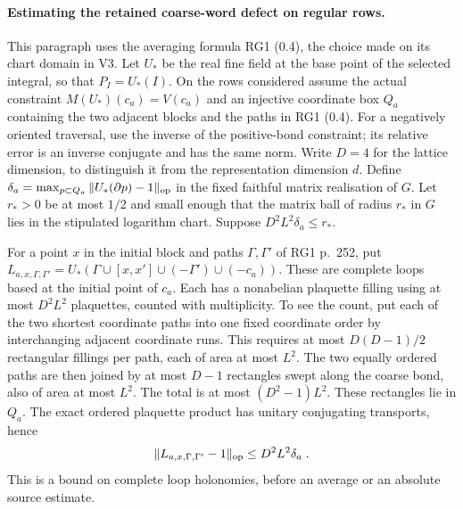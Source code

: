 \documentclass[11pt]{article}
\begin{document}
\paragraph{Estimating the retained coarse-word defect on regular rows.}
This paragraph uses the averaging formula RG1 (0.4), the choice
made on its chart domain in V3. Let $U_*$ be the real fine field
at the base point of the selected integral, so that
$P_I=U_*(I)$. On the rows considered assume the actual constraint
$M(U_*)(c_a)=V(c_a)$ and an injective coordinate box $Q_a$
containing the two adjacent blocks and the paths in RG1 (0.4).
For a negatively oriented traversal, use the inverse of the
positive-bond constraint; its relative error is an inverse
conjugate and has the same norm.
Write $D=4$ for the lattice dimension, to distinguish it from
the representation dimension $d$. Define
$\delta_a=\max_{p\subset Q_a}\|U_*(\partial p)-1\|_{\rm op}$
in the fixed faithful matrix realisation of $G$.
Let $r_*>0$ be at most $1/2$ and small enough that the matrix
ball of radius $r_*$ in $G$ lies in the stipulated logarithm
chart. Suppose $D^2L^2\delta_a\leq r_*$.

For a point $x$ in the initial block and paths $\Gamma,\Gamma'$
of RG1 p.~252, put
$L_{a,x,\Gamma,\Gamma'}=
U_*(\Gamma\cup[x,x']\cup(-\Gamma')\cup(-c_a))$.
These are complete loops based at the initial point of $c_a$.
Each has a nonabelian plaquette filling using at most $D^2L^2$
plaquettes, counted with multiplicity. To see the count, put each
of the two shortest coordinate paths into one fixed coordinate
order by interchanging adjacent coordinate runs. This requires
at most $D(D-1)/2$ rectangular fillings per path, each of area at
most $L^2$. The two equally ordered paths are then joined by
at most $D-1$ rectangles swept along the coarse bond, also of
area at most $L^2$. The total is at most
$(D^2-1)L^2$. These rectangles lie in $Q_a$. The exact ordered
plaquette product has unitary conjugating transports, hence
\begin{equation}\label{eq:c8-fourth-average-loop-bound}
    \|L_{a,x,\Gamma,\Gamma'}-1\|_{\rm op}
        \leq D^2L^2\delta_a\;.
\end{equation}
This is a bound on complete loop holonomies, before an average
or an absolute source estimate.
\end{document}
